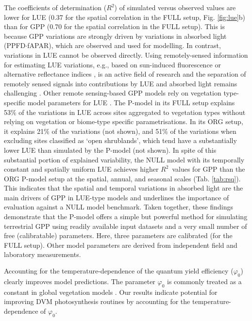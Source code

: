 \documentclass[gmd, manuscript]{copernicus}
\newcommand{\rsq}{$R^2$}
\begin{document}
The coefficients of determination (\rsq ) of simulated versus observed values are lower for LUE (0.37 for the spatial correlation in the FULL setup, Fig. \ref{fig:lue}b) than for GPP (0.70 for the spatial correlation in the FULL setup). This is because GPP variations are strongly driven by variations in absorbed light (PPFD$\cdot$fAPAR), which are observed and used for modelling. In contrast, variations in LUE cannot be observed directly. Using remotely-sensed information for estimating LUE variations, e.g., based on sun-induced fluorescence \citep{frankenberg18, li18gcb, ryu19rse} or alternative reflectance indices \citep{gamon92, gamon16pnas, Badgley2017-tw}, is an active field of research and the separation of remotely sensed signals into contributions by LUE and absorbed light remains challenging \citep{porcarcastell14, ryu19rse}. Other remote sensing-based GPP models rely on vegetation type-specific model parameters for LUE \citep{Zhang2017-yr, running04, jiang16rse}. The P-model in its FULL setup explains 53\% of the variations in LUE across sites aggregated to vegetation types without relying on vegetation or biome-type specific parametrisations. In its ORG setup, it explains 21\% of the variations (not shown), and 51\% of the variations when excluding sites classified as `open shrublands', which tend have a substantially lower LUE than simulated by the P-model (not shown). In spite of this substantial portion of explained variability, the NULL model with its temporally constant and spatially uniform LUE achieves higher \rsq\ values for GPP than the ORG P-model setup at the spatial, annual, and seasonal scales (Tab. \ref{tab:rsq}). This indicates that the spatial and temporal variations in absorbed light are the main drivers of GPP in LUE-type models and underlines the importance of evaluation against a NULL model benchmark. Taken together, these findings demonstrate that the P-model offers a simple but powerful method for simulating terrestrial GPP using readily available input datasets and a very small number of free (calibratable) parameters. Here, three parameters are calibrated (for the FULL setup). Other model parameters are derived from independent field and laboratory measurements.


Accounting for the temperature-dependence of the quantum yield efficiency ($\varphi_0$) clearly improves model predictions. The parameter $\varphi_0$ is commonly treated as a constant in global vegetation models \citep{rogers17}. Our results indicate potential for improving DVM photosynthesis routines by accounting for the temperature-dependence of $\varphi_0$. 
\end{document}
